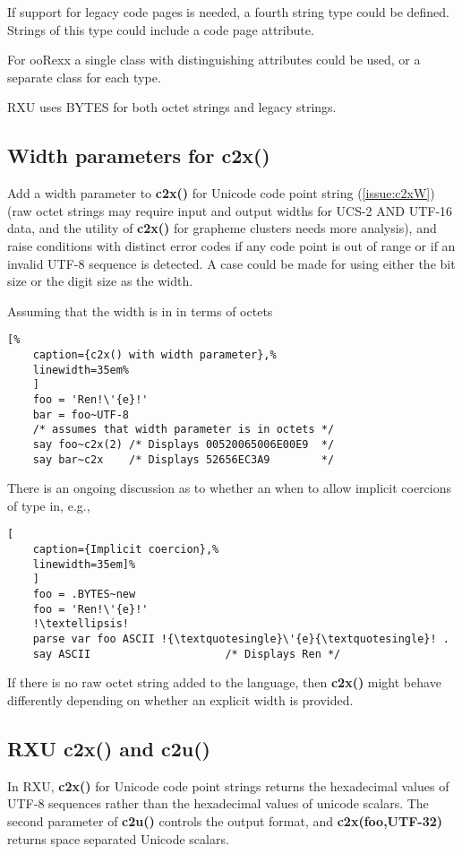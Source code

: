 \documentclass[b4paper]{article}
\begin{document}
If support for legacy code pages is needed, a fourth string type could be defined.
Strings of this type could include a code page attribute.

For ooRexx a single class with distinguishing attributes could be
used, or a separate class for each type.

RXU uses BYTES for both octet strings and legacy strings.

\subsection{Width parameters for c2x()}

Add a width parameter to \textbf{c2x()} for Unicode code point string
(\cref{issue:c2xW})
(raw octet strings may require input and output widths for UCS-2 AND UTF-16 data, and the
utility of \textbf{c2x()} for grapheme clusters needs more
analysis), and raise conditions with distinct error codes if any code
point is out of range or if an invalid UTF-8 sequence is detected.  A
case could be made for using either the bit size or the digit size as
the width.

Assuming that the width is in in terms of octets
\begin{lstlisting}[%
    caption={c2x() with width parameter},%
    linewidth=35em%
    ]
    foo = 'Ren!\'{e}!'
    bar = foo~UTF-8
    /* assumes that width parameter is in octets */
    say foo~c2x(2) /* Displays 00520065006E00E9  */
    say bar~c2x    /* Displays 52656EC3A9        */
\end{lstlisting}

There is an ongoing discussion as to whether an when to allow implicit coercions of type in, e.g., 
\begin{lstlisting}[
    caption={Implicit coercion},% 
    linewidth=35em]%
    ]
    foo = .BYTES~new
    foo = 'Ren!\'{e}!'
    !\textellipsis!
    parse var foo ASCII !{\textquotesingle}\'{e}{\textquotesingle}! .
    say ASCII                     /* Displays Ren */
\end{lstlisting}

If there is no raw octet string added to the language,
then \textbf{c2x()} might behave differently depending on whether an explicit width is provided.

\subsection{RXU c2x() and c2u()}
In RXU, \textbf{c2x()} for Unicode code point strings returns the
hexadecimal values of UTF-8 sequences rather than the hexadecimal
values of unicode scalars. The second parameter of \textbf{c2u()}
controls the output format, and \textbf{c2x(foo,UTF-32)} returns space
separated Unicode scalars.
\end{document}
